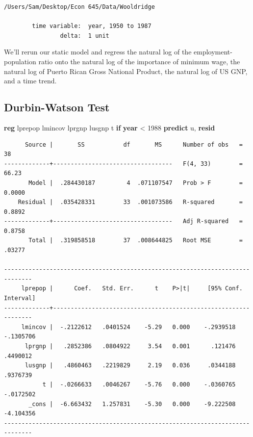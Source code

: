 \documentclass[
]{book}
\newenvironment{Shaded}{\begin{snugshade}}{\end{snugshade}}
\newcommand{\FunctionTok}[1]{\textcolor[rgb]{0.13,0.29,0.53}{\textbf{#1}}}
\newcommand{\KeywordTok}[1]{\textcolor[rgb]{0.13,0.29,0.53}{\textbf{#1}}}
\newcommand{\NormalTok}[1]{#1}
\begin{document}
\begin{verbatim}
/Users/Sam/Desktop/Econ 645/Data/Wooldridge

        time variable:  year, 1950 to 1987
                delta:  1 unit
\end{verbatim}

We'll rerun our static model and regress the natural log of the employment-population
ratio onto the natural log of the importance of minimum wage, the natural log
of Puerto Rican Gross National Product, the natural log of US GNP, and a time trend.

\subsection*{Durbin-Watson Test}\label{durbin-watson-test}

\begin{Shaded}
\begin{Highlighting}[]
\KeywordTok{reg}\NormalTok{ lprepop lmincov lprgnp lusgnp t }\KeywordTok{if} \FunctionTok{year}\NormalTok{ \textless{} 1988}
\KeywordTok{predict}\NormalTok{ u, }\KeywordTok{resid}
\end{Highlighting}
\end{Shaded}

\begin{verbatim}
      Source |       SS           df       MS      Number of obs   =        38
-------------+----------------------------------   F(4, 33)        =     66.23
       Model |  .284430187         4  .071107547   Prob > F        =    0.0000
    Residual |  .035428331        33  .001073586   R-squared       =    0.8892
-------------+----------------------------------   Adj R-squared   =    0.8758
       Total |  .319858518        37  .008644825   Root MSE        =    .03277

------------------------------------------------------------------------------
     lprepop |      Coef.   Std. Err.      t    P>|t|     [95% Conf. Interval]
-------------+----------------------------------------------------------------
     lmincov |  -.2122612   .0401524    -5.29   0.000    -.2939518   -.1305706
      lprgnp |   .2852386   .0804922     3.54   0.001      .121476    .4490012
      lusgnp |   .4860463   .2219829     2.19   0.036     .0344188    .9376739
           t |  -.0266633   .0046267    -5.76   0.000    -.0360765   -.0172502
       _cons |  -6.663432   1.257831    -5.30   0.000    -9.222508   -4.104356
------------------------------------------------------------------------------
\end{verbatim}
\end{document}
